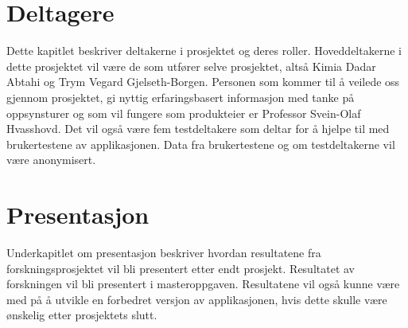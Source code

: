 \section{Deltagere}
Dette kapitlet beskriver deltakerne i prosjektet og deres roller.
\newline
\newline
\noindent
Hoveddeltakerne i dette prosjektet vil være de som utfører selve prosjektet, altså Kimia Dadar Abtahi og Trym Vegard Gjelseth-Borgen. Personen som kommer til å veilede oss gjennom prosjektet, gi nyttig erfaringsbasert informasjon med tanke på oppsynsturer og som vil fungere som produkteier er Professor Svein-Olaf Hvasshovd. Det vil også være fem testdeltakere som deltar for å hjelpe til med brukertestene av applikasjonen. Data fra brukertestene og om testdeltakerne vil være anonymisert.

\section{Presentasjon}
Underkapitlet om presentasjon beskriver hvordan resultatene fra forskningsprosjektet vil bli presentert etter endt prosjekt.
\newline
\newline
\noindent
Resultatet av forskningen vil bli presentert i masteroppgaven. Resultatene vil også kunne være med på å utvikle en forbedret versjon av applikasjonen, hvis dette skulle være ønskelig etter prosjektets slutt.